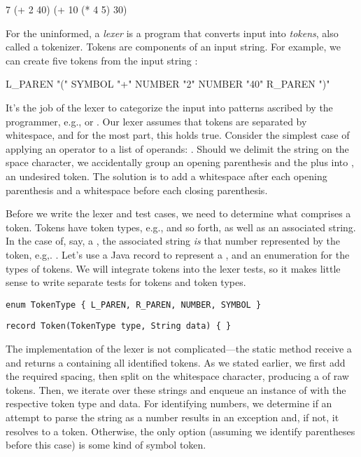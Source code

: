 \begin{verbnobox}[\small]
7
(+ 2 40)
(+ 10 (* 4 5) 30)
\end{verbnobox}

For the uninformed, a \emph{lexer} is a program that converts input into \emph{tokens}, also called a tokenizer. 
Tokens are components of an input string. 
For example, we can create five tokens from the input string : 

\begin{verbnobox}[\small]
L_PAREN "("
SYMBOL "+"
NUMBER "2"
NUMBER "40"
R_PAREN ")"
\end{verbnobox}

It's the job of the lexer to categorize the input into patterns ascribed by the programmer, e.g.,  or . 
Our lexer assumes that tokens are separated by whitespace, and for the most part, this holds true. 
Consider the simplest case of applying an operator to a list of operands: . 
Should we delimit the string on the space character, we accidentally group an opening parenthesis and the plus into , an undesired token. 
The solution is to add a whitespace after each opening parenthesis and a whitespace before each closing parenthesis. 

Before we write the lexer and test cases, we need to determine what comprises a token. 
Tokens have token types, e.g.,  and so forth, as well as an associated string. 
In the case of, say, a , the associated string \emph{is} that number represented by the token, e.g,. . 
Let's use a Java record to represent a , and an enumeration for the types of tokens. 
We will integrate tokens into the lexer tests, so it makes little sense to write separate tests for tokens and token types.

\begin{lstlisting}[language=MyJava]
enum TokenType { L_PAREN, R_PAREN, NUMBER, SYMBOL }
\end{lstlisting}

\begin{lstlisting}[language=MyJava]
record Token(TokenType type, String data) { }
\end{lstlisting}

The implementation of the lexer is not complicated---the static  method receive a  and returns a  containing all identified tokens. 
As we stated earlier, we first add the required spacing, then split on the whitespace character, producing a  of raw tokens. 
Then, we iterate over these strings and enqueue an instance of  with the respective token type and data. 
For identifying numbers, we determine if an attempt to parse the string as a number results in an exception and, if not, it resolves to a  token. 
Otherwise, the only option (assuming we identify parentheses before this case) is some kind of symbol token.

